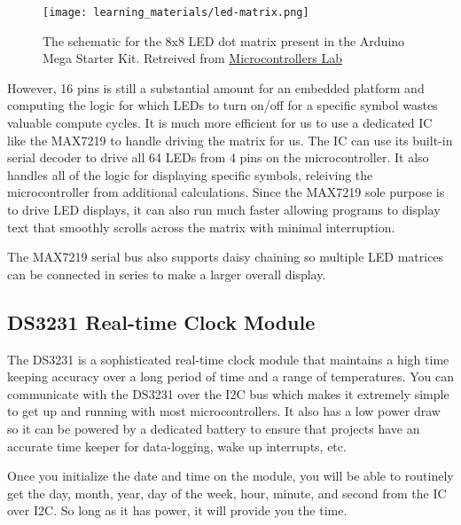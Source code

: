     \begin{figure}[b!]
        \texttt{[image: learning\_materials/led-matrix.png]}
        \caption[LED Matrix Schematic]{The schematic for the 8x8 LED dot matrix present in the Arduino Mega Starter Kit. 
        Retreived from \href{https://microcontrollerslab.com/wp-content/uploads/2016/11/led-matrix.jpg?ezimgfmt=ng:webp/ngcb1}{Microcontrollers Lab}}
    \end{figure}

    However, 16 pins is still a substantial amount for an embedded platform and computing the logic for which LEDs to turn on/off for a specific symbol wastes valuable compute cycles.
    It is much more efficient for us to use a dedicated IC like the MAX7219 to handle driving the matrix for us. 
    The IC can use its built-in serial decoder to drive all 64 LEDs from 4 pins on the microcontroller.
    It also handles all of the logic for displaying specific symbols, releiving the microcontroller from additional calculations.
    Since the MAX7219 sole purpose is to drive LED displays, it can also run much faster allowing programs to display text that smoothly scrolls across the matrix with minimal interruption.
    
    The MAX7219 serial bus also supports daisy chaining so multiple LED matrices can be connected in series to make a larger overall display.

    \subsection*{DS3231 Real-time Clock Module}
    The DS3231 is a sophisticated real-time clock module that maintains a high time keeping accuracy over a long period of time and a range of temperatures.
    You can communicate with the DS3231 over the I2C bus which makes it extremely simple to get up and running with most microcontrollers.
    It also has a low power draw so it can be powered by a dedicated battery to ensure that projects have an accurate time keeper for data-logging, wake up interrupts, etc.

    Once you initialize the date and time on the module, you will be able to routinely get the day, month, year, day of the week, hour, minute, and second from the IC over I2C. So long as it has power, it will provide you the time.

